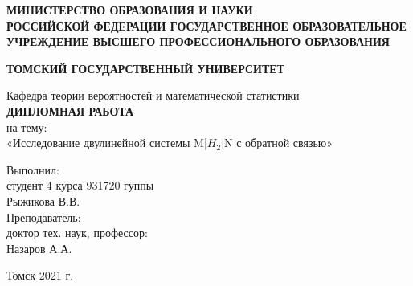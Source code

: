 \begin{titlepage}
		\begin{center}
			\large
			\textbf{МИНИСТЕРСТВО ОБРАЗОВАНИЯ И НАУКИ\\ РОССИЙСКОЙ ФЕДЕРАЦИИ
				ГОСУДАРСТВЕННОЕ ОБРАЗОВАТЕЛЬНОЕ УЧРЕЖДЕНИЕ ВЫСШЕГО ПРОФЕССИОНАЛЬНОГО ОБРАЗОВАНИЯ}
			
			\textbf{ТОМСКИЙ ГОСУДАРСТВЕННЫЙ УНИВЕРСИТЕТ}
			\vspace{0.25cm}
			
			Кафедра теории вероятностей и математической статистики\\
			\vspace{1,5cm}
			\textbf{ДИПЛОМНАЯ РАБОТА}\\[5mm]
			
			на тему:\\
			«Исследование двулинейной системы M|$H_{2}$|N с обратной связью» 
			
			\bigskip
			
			
		\end{center}
		\vfill
		
		\newlength{\ML}
		
		\hfill\begin{minipage}{0.45\textwidth}
			Выполнил:\\
			студент 4 курса 931720 гуппы\\
			Рыжикова В.В.\\
			
			Преподаватель:\\
			доктор тех. наук, профессор:\\
			Назаров А.А.
		\end{minipage}%
		\vspace{4cm}
		\begin{center}
			Томск 2021 г.
		\end{center}
\end{titlepage}